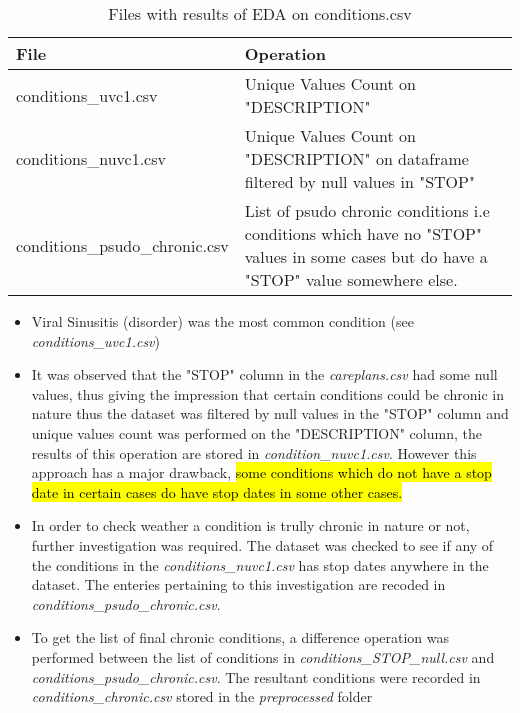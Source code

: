 \documentclass[12pt, twosided]{report}  %
\begin{document}
\begin{table}[H]
	\centering
	\begin{tabular}{p{5cm}|p{14.5cm}}
		\textbf{File}                & \textbf{Operation} \\ \hline
		conditions\_uvc1.csv     & Unique Values Count on "DESCRIPTION"   \\
		conditions\_nuvc1.csv    & Unique Values Count on "DESCRIPTION"  on dataframe filtered by null values in "STOP" \\
		conditions\_psudo\_chronic.csv & List of psudo chronic conditions i.e conditions which have no "STOP" values in some cases but do have a "STOP" value somewhere else.
	\end{tabular}
	\caption{Files with results of EDA on conditions.csv}
\end{table}

\begin{itemize}
	\item Viral Sinusitis (disorder) was the most common condition (see \textit{conditions\_uvc1.csv})
	
	\item It was observed that the "STOP" column in the \textit{careplans.csv} had some null values, thus giving the impression that certain conditions could be chronic in nature thus the dataset was filtered by null values in the "STOP" column and unique values count was performed on the "DESCRIPTION" column, the results of this operation are stored in \textit{condition\_nuvc1.csv}. However this approach has a major drawback, \hl{some conditions which do not have a stop date in certain cases do have stop dates in some other cases.} 
	
	\item In order to check weather a condition is trully chronic in nature or not, further investigation was required. The dataset was checked to see if any of the conditions in the \textit{conditions\_nuvc1.csv} has stop dates anywhere in the dataset. The enteries pertaining to this investigation are recoded in \textit{conditions\_psudo\_chronic.csv}.
	
	\item To get the list of final chronic conditions, a difference operation was performed between the list of conditions in \textit{conditions\_STOP\_null.csv} and \textit{conditions\_psudo\_chronic.csv}. The resultant conditions were recorded in \textit{conditions\_chronic.csv} stored in the \textit{preprocessed} folder
\end{itemize}
\end{document}
